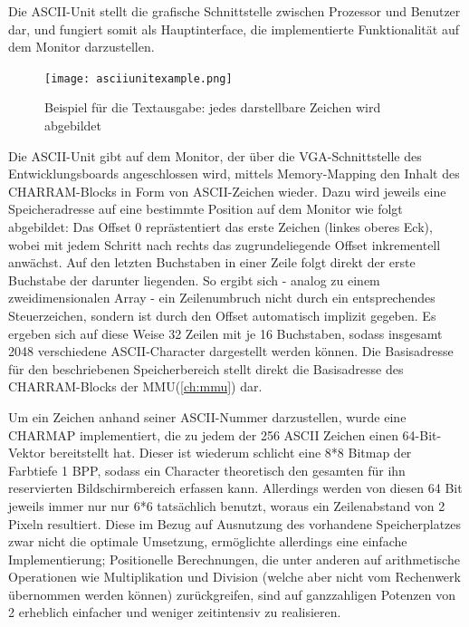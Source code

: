 
\label{ch:asciiunit}
Die ASCII-Unit stellt die grafische Schnittstelle zwischen Prozessor und Benutzer dar, und fungiert somit als Hauptinterface, die implementierte Funktionalit\"at auf dem Monitor darzustellen.

\begin{figure}[!htbp]
	\centering
	\label{fig:exampletext}
	\texttt{[image: asciiunitexample.png]}
	\caption[Beispiel f\"ur die Textausgabe]{Beispiel f\"ur die Textausgabe: jedes darstellbare Zeichen wird abgebildet}
\end{figure}


Die ASCII-Unit gibt auf dem Monitor, der \"uber die VGA-Schnittstelle des Entwicklungsboards angeschlossen wird, mittels Memory-Mapping den Inhalt des CHARRAM-Blocks in Form von ASCII-Zeichen wieder. Dazu wird jeweils eine Speicheradresse auf eine bestimmte Position auf dem Monitor wie folgt abgebildet: Das Offset 0 repr\"astentiert das erste Zeichen (linkes oberes Eck), wobei mit jedem Schritt nach rechts das zugrundeliegende Offset inkrementell anw\"achst. Auf den letzten Buchstaben in einer Zeile folgt direkt der erste Buchstabe der darunter liegenden. So ergibt sich - analog zu einem zweidimensionalen Array - ein Zeilenumbruch nicht durch ein entsprechendes Steuerzeichen, sondern ist durch den Offset automatisch implizit gegeben. Es ergeben sich auf diese Weise 32 Zeilen mit je 16 Buchstaben, sodass insgesamt 2048 verschiedene ASCII-Character dargestellt werden k\"onnen. Die Basisadresse f\"ur den beschriebenen Speicherbereich stellt direkt die Basisadresse des CHARRAM-Blocks der MMU(\ref{ch:mmu}) dar.

Um ein Zeichen anhand seiner ASCII-Nummer darzustellen, wurde eine CHARMAP implementiert, die zu jedem der 256 ASCII Zeichen einen 64-Bit-Vektor bereitstellt hat. Dieser ist wiederum schlicht eine 8*8 Bitmap der Farbtiefe 1 BPP, sodass ein Character theoretisch den gesamten f\"ur ihn reservierten Bildschirmbereich erfassen kann. Allerdings  werden von diesen 64 Bit jeweils immer nur nur 6*6 tats\"achlich benutzt, woraus ein Zeilenabstand von 2 Pixeln resultiert. Diese im Bezug auf Ausnutzung des vorhandene Speicherplatzes zwar nicht die optimale Umsetzung, erm\"oglichte allerdings eine einfache Implementierung; Positionelle Berechnungen, die unter anderen auf arithmetische Operationen wie Multiplikation und Division (welche aber nicht vom Rechenwerk \"ubernommen werden k\"onnen) zur\"uckgreifen, sind auf ganzzahligen Potenzen von 2 erheblich einfacher und weniger zeitintensiv zu realisieren.

